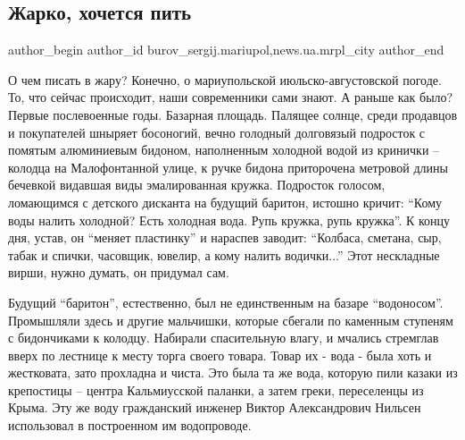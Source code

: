  
 
 
 
 
 
\subsection{Жарко, хочется пить}
\label{sec:03_08_2017.stz.news.ua.mrpl_city.1.zharko_hochetsja_pitj}
 
\ifcmt
 author_begin
   author_id burov_sergij.mariupol,news.ua.mrpl_city
 author_end
\fi


О чем писать в жару? Конечно, о мариупольской  июльско-августовской  погоде.
То, что сейчас происходит, наши современники сами знают. А раньше как было?
Первые послевоенные годы. Базарная площадь. Палящее солнце, среди продавцов и
по­купателей шныряет босоногий, вечно голодный долговязый подросток с помятым
алюминиевым бидоном, напол­ненным холодной водой из кринички – колодца на
Малофонтанной улице, к ручке бидона приторочена метровой длины бечевкой
видавшая виды эмалированная кружка. Подросток голосом, ломающимся с детского
дисканта на будущий баритон, истошно кричит: \enquote{Кому воды налить холодной? Есть
холодная вода. Рупь кружка, рупь кружка}. К концу дня, устав, он \enquote{меняет
пластинку} и нараспев заводит: \enquote{Колбаса, сметана, сыр, табак и спички,
часовщик, ювелир, а кому налить водички...} Этот нескладные вирши, нужно
думать, он придумал сам.


Будущий \enquote{баритон}, естественно, был не единственным на базаре \enquote{водоносом}.
Промышляли здесь  и другие мальчишки, которые сбегали по каменным ступеням с
бидончиками к колодцу. Набирали спасительную влагу, и мчались стремглав вверх
по лестнице к месту торга своего товара.  Товар их - вода - была хоть и
жестковата, зато  прохладна и чиста.  Это была та же вода, которую пили  казаки
из крепостицы – центра Кальмиусской паланки, а затем греки, переселенцы из
Крыма. Эту же воду гражданский  инженер  Виктор Александрович Нильсен
использовал в построенном им водопроводе.


